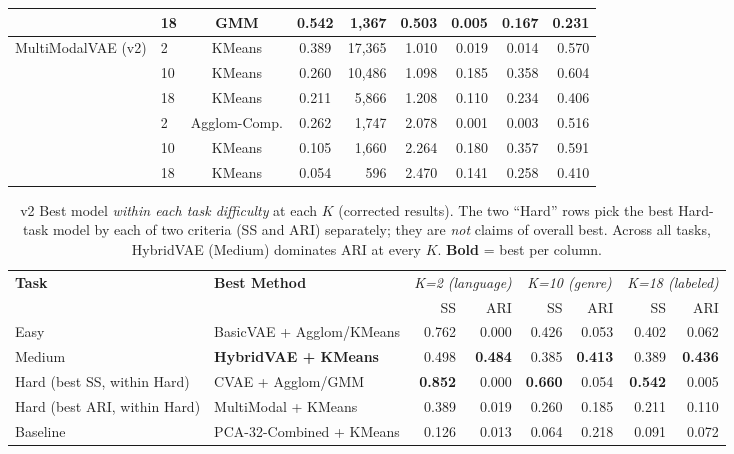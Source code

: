 \documentclass{article}
\begin{document}
\begin{table}[H]
\begin{tabular}{llccrrrrr}
 & 18 & GMM         & \textbf{0.542} & 1,367 & \textbf{0.503} & 0.005 & 0.167 & 0.231 \\
\midrule
\multirow{3}{*}{MultiModalVAE (v2)}
 & 2  & KMeans & 0.389 & 17,365 & 1.010 & 0.019 & 0.014 & 0.570 \\
 & 10 & KMeans & 0.260 & 10,486 & 1.098 & 0.185 & 0.358 & 0.604 \\
 & 18 & KMeans & 0.211 &  5,866 & 1.208 & 0.110 & 0.234 & 0.406 \\
\midrule\rowcolor{gray!15}
\multirow{3}{*}{PCA-32-MFCC}
 & 2  & Agglom-Comp. & 0.262 & 1,747 & 2.078 & 0.001 & 0.003 & 0.516 \\
 & 10 & KMeans       & 0.105 & 1,660 & 2.264 & 0.180 & 0.357 & 0.591 \\
 & 18 & KMeans       & 0.054 &   596 & 2.470 & 0.141 & 0.258 & 0.410 \\
\bottomrule
\end{tabular}
\end{table}

\begin{table}[H]
\centering
\caption{v2 Best model \emph{within each task difficulty} at each $K$ (corrected results).
The two ``Hard'' rows pick the best Hard-task model by each of two criteria (SS and ARI)
separately; they are \emph{not} claims of overall best. Across all tasks, HybridVAE
(Medium) dominates ARI at every $K$. \textbf{Bold} = best per column.}
\label{tab:v2_summary}
\small
\begin{tabular}{llrrrrrr}
\toprule
\textbf{Task} & \textbf{Best Method} &
\multicolumn{2}{c}{\textit{K=2 (language)}} &
\multicolumn{2}{c}{\textit{K=10 (genre)}} &
\multicolumn{2}{c}{\textit{K=18 (labeled)}} \\
\cmidrule(lr){3-4}\cmidrule(lr){5-6}\cmidrule(lr){7-8}
 & & SS & ARI & SS & ARI & SS & ARI \\
\midrule
Easy      & BasicVAE + Agglom/KMeans & 0.762 & 0.000 & 0.426 & 0.053 & 0.402 & 0.062 \\
Medium    & \textbf{HybridVAE + KMeans} & 0.498 & \textbf{0.484} & 0.385 & \textbf{0.413} & 0.389 & \textbf{0.436} \\
Hard (best SS, within Hard) & CVAE + Agglom/GMM & \textbf{0.852} & 0.000 & \textbf{0.660} & 0.054 & \textbf{0.542} & 0.005 \\
Hard (best ARI, within Hard) & MultiModal + KMeans & 0.389 & 0.019 & 0.260 & 0.185 & 0.211 & 0.110 \\
\midrule
\rowcolor{gray!15} Baseline & PCA-32-Combined + KMeans & 0.126 & 0.013 & 0.064 & 0.218 & 0.091 & 0.072 \\
\bottomrule
\end{tabular}
\end{table}
\end{document}

